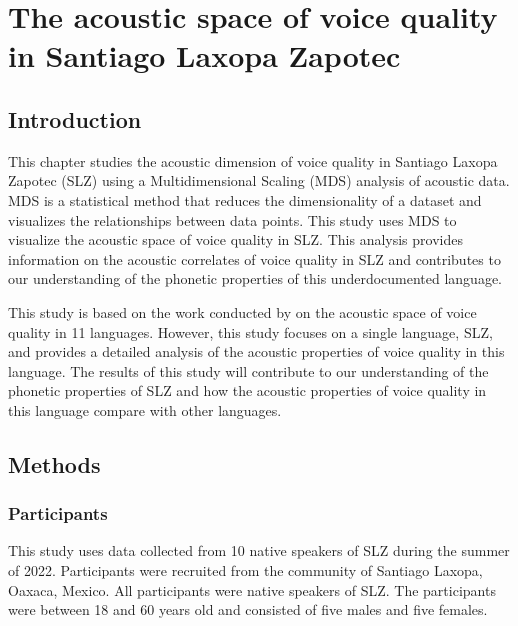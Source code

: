 \chapter{The acoustic space of voice quality in Santiago Laxopa Zapotec} \label{ch:acousticlandscape}

\section{Introduction} \label{sec:acousticlandscape:intro}

This chapter studies the acoustic dimension of voice quality in Santiago Laxopa Zapotec (SLZ) using a Multidimensional Scaling (MDS) analysis of acoustic data. MDS is a statistical method that reduces the dimensionality of a dataset and visualizes the relationships between data points. This study uses MDS to visualize the acoustic space of voice quality in SLZ. This analysis provides information on the acoustic correlates of voice quality in SLZ and contributes to our understanding of the phonetic properties of this underdocumented language.

This study is based on the work conducted by \citet{keatingCrosslanguageAcousticSpace2023} on the acoustic space of voice quality in 11 languages. However, this study focuses on a single language, SLZ, and provides a detailed analysis of the acoustic properties of voice quality in this language. The results of this study will contribute to our understanding of the phonetic properties of SLZ and how the acoustic properties of voice quality in this language compare with other languages.

\section{Methods} \label{sec:acousticlandscape:methods}
\subsection{Participants} \label{sec:acousticlandscape:participants}

This study uses data collected from 10 native speakers of SLZ during the summer of 2022. Participants were recruited from the community of Santiago Laxopa, Oaxaca, Mexico. All participants were native speakers of SLZ. The participants were between 18 and 60 years old and consisted of five males and five females.
